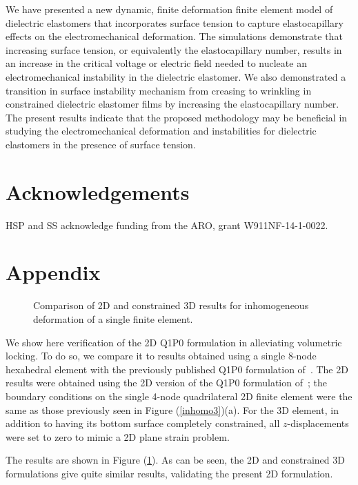 \documentclass[final,authoryear,3p,times]{elsarticle}
\begin{document}
We have presented a new dynamic, finite deformation finite element model of dielectric elastomers that incorporates surface tension to capture elastocapillary effects on the electromechanical deformation.  The simulations demonstrate that increasing surface tension, or equivalently the elastocapillary number, results in an increase in the critical voltage or electric field needed to nucleate an electromechanical instability in the dielectric elastomer.  We also demonstrated a transition in surface instability mechanism from creasing to wrinkling in constrained dielectric elastomer films by increasing the elastocapillary number.  The present results indicate that the proposed methodology may be beneficial in studying the electromechanical deformation and instabilities for dielectric elastomers in the presence of surface tension.

\section{Acknowledgements}

HSP and SS acknowledge funding from the ARO, grant W911NF-14-1-0022.

\section{Appendix}

\begin{figure}
\centering
{}
	\caption{Comparison of 2D and constrained 3D results for inhomogeneous deformation of a single finite element.}
	\label{2d3d}
\end{figure}

We show here verification of the 2D Q1P0 formulation in alleviating volumetric locking.  To do so, we compare it to results obtained using a single 8-node hexahedral element with the previously published Q1P0 formulation of~\citet{parkCMAME2013}.  The 2D results were obtained using the 2D version of the Q1P0 formulation of~\citet{simoCMAME1985}; the boundary conditions on the single 4-node quadrilateral 2D finite element were the same as those previously seen in Figure (\ref{inhomo3})(a).  For the 3D element, in addition to having its bottom surface completely constrained, all $z$-displacements were set to zero to mimic a 2D plane strain problem.  

The results are shown in Figure (\ref{2d3d}).  As can be seen, the 2D and constrained 3D formulations give quite similar results, validating the present 2D formulation.



\end{document}
